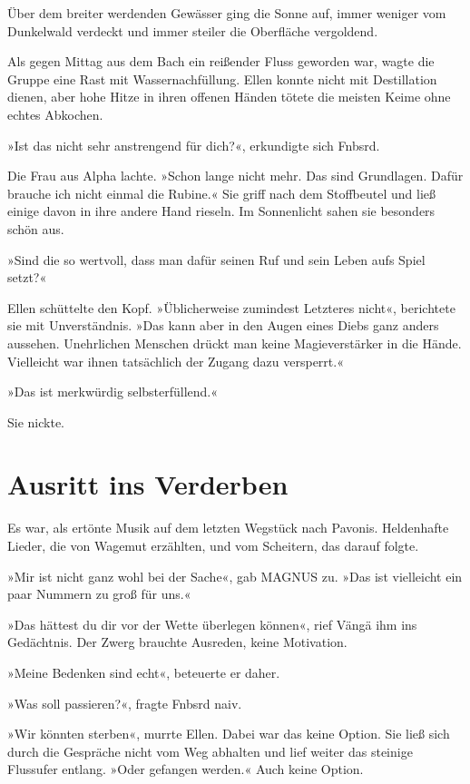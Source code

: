Über dem breiter werdenden Gewässer ging die Sonne auf, immer weniger vom Dunkelwald verdeckt und immer steiler die Oberfläche vergoldend.

Als gegen Mittag aus dem Bach ein reißender Fluss geworden war, wagte die Gruppe eine Rast mit Wassernachfüllung. Ellen konnte nicht mit Destillation dienen, aber hohe Hitze in ihren offenen Händen tötete die meisten Keime ohne echtes Abkochen.

»Ist das nicht sehr anstrengend für dich?«, erkundigte sich Fnbsrd.

Die Frau aus Alpha lachte. »Schon lange nicht mehr. Das sind Grundlagen. Dafür brauche ich nicht einmal die Rubine.« Sie griff nach dem Stoffbeutel und ließ einige davon in ihre andere Hand rieseln. Im Sonnenlicht sahen sie besonders schön aus.

»Sind die so wertvoll, dass man dafür seinen Ruf und sein Leben aufs Spiel setzt?«

Ellen schüttelte den Kopf. »Üblicherweise zumindest Letzteres nicht«, berichtete sie mit Unverständnis. »Das kann aber in den Augen eines Diebs ganz anders aussehen. Unehrlichen Menschen drückt man keine Magieverstärker in die Hände. Vielleicht war ihnen tatsächlich der Zugang dazu versperrt.«

»Das ist merkwürdig selbsterfüllend.«

Sie nickte.


\chapter{Ausritt ins Verderben}

\noindent {}

Es war, als ertönte Musik auf dem letzten Wegstück nach Pavonis. Heldenhafte Lieder, die von Wagemut erzählten, und vom Scheitern, das darauf folgte.

»Mir ist nicht ganz wohl bei der Sache«, gab MAGNUS zu. »Das ist vielleicht ein paar Nummern zu groß für uns.«

»Das hättest du dir vor der Wette überlegen können«, rief Vängä ihm ins Gedächtnis. Der Zwerg brauchte Ausreden, keine Motivation.

»Meine Bedenken sind echt«, beteuerte er daher.

»Was soll passieren?«, fragte Fnbsrd naiv.

»Wir könnten sterben«, murrte Ellen. Dabei war das keine Option. Sie ließ sich durch die Gespräche nicht vom Weg abhalten und lief weiter das steinige Flussufer entlang. »Oder gefangen werden.« Auch keine Option.

